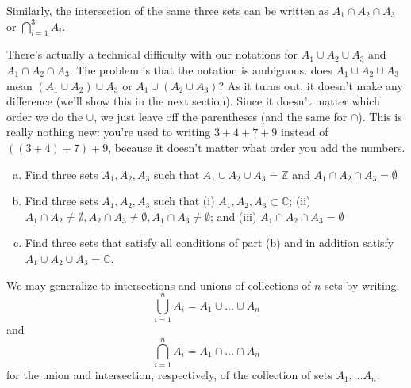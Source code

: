 \medskip{}
Similarly, the intersection of the same three sets can be written as $A_{1} \cap A_2 \cap A_3$ or $\bigcap_{i = 1}^{3} A_i.$

\begin{rem}
There's actually a technical difficulty with our notations for  $A_{1} \cup A_2 \cup A_3$ and $A_{1} \cap A_2 \cap A_3$. The problem is that the notation is ambiguous: does $A_{1} \cup A_2 \cup A_3$ mean $(A_{1} \cup A_2) \cup A_3$ or $A_{1} \cup (A_2 \cup A_3)$? As it turns out, it doesn't make any difference (we'll show this in the next section). Since it doesn't matter which order we do the $\cup$, we just leave off the parentheses (and the same for $\cap$). This is really nothing new: you're used to writing $3 + 4 + 7 + 9$ instead of $((3+4)+7)+9$, because it doesn't matter what order you add the numbers.
\end{rem}

\begin{exercise}\label{exercise:sets:12}
\begin{enumerate}[(a)]
\item
Find three sets $A_1, A_2, A_3$ such that $A_{1} \cup A_2 \cup A_3 = {\mathbb Z}$ and $A_{1} \cap A_2 \cap A_3 = \emptyset$
\item
Find three sets $A_1, A_2, A_3$ such that (i) $A_1, A_2, A_3 \subset {\mathbb C}$; (ii) $A_1 \cap A_2 \neq \emptyset, A_2 \cap A_3 \neq  \emptyset, A_1 \cap A_3 \neq \emptyset$; and (iii) $A_{1} \cap A_2 \cap A_3 = \emptyset$
\item
Find three sets that satisfy all conditions of part (b) and in addition satisfy $A_{1} \cup A_2 \cup A_3 = {\mathbb C}$.
\end{enumerate}
\end{exercise}

\noindent
We may generalize to intersections and unions of collections of $n$ sets by writing:
\[
\bigcup_{i = 1}^{n} A_{i} = A_{1} \cup \ldots \cup A_n
\]
and
\[
\bigcap_{i = 1}^{n} A_{i} = A_{1} \cap \ldots \cap A_n
\]
for the union and intersection, respectively, of the collection of sets $A_1, \ldots A_n$.



